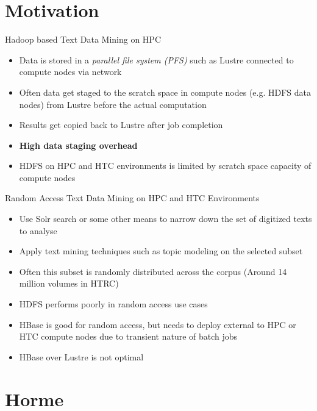 \documentclass[newPxFont]{beamer}
\begin{document}
\section{Motivation}

\begin{frame}[c]{Hadoop based Text Data Mining on HPC}
  \begin{itemize}
    \item Data is stored in a \emph{parallel file system (PFS)} such as Lustre connected to compute nodes via network
    \item Often data get staged to the scratch space in compute nodes (e.g. HDFS data nodes) from Lustre before the actual computation
    \item Results get copied back to Lustre after job completion
    \item \textbf{High data staging overhead}
    \item HDFS on HPC and HTC environments is limited by scratch space capacity of compute nodes
  \end{itemize}
\end{frame}

\begin{frame}[c]{Random Access Text Data Mining on HPC and HTC Environments}
  \begin{itemize}
    \item Use Solr search or some other means to narrow down the set of digitized texts to analyse
    \item Apply text mining techniques such as topic modeling on the selected subset
    \item Often this subset is randomly distributed across the corpus (Around 14 million volumes in HTRC)
    \item HDFS performs poorly in random access use cases
    \item HBase is good for random access, but needs to deploy external to HPC or HTC compute nodes due to transient nature of batch jobs
    \item HBase over Lustre is not optimal
  \end{itemize}
\end{frame}

\section{Horme}
\begin{frame}[c]{}
  
\end{frame}
\end{document}
